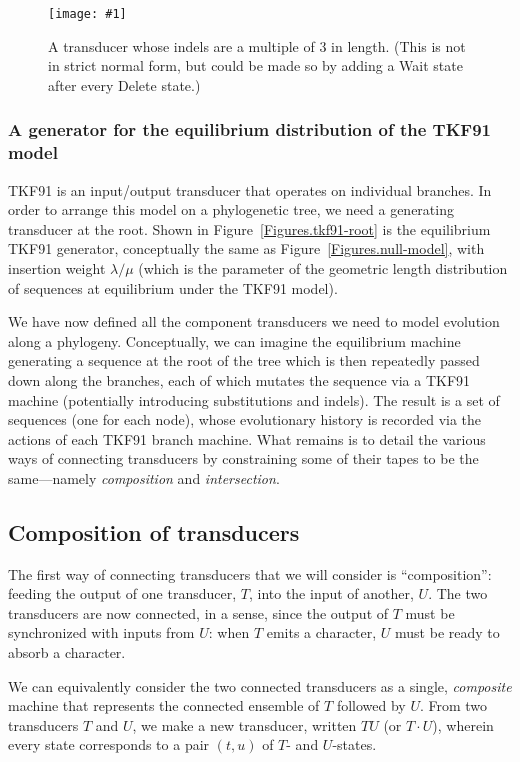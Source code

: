 \documentclass{article}
\newcommand{\seclabel}[1]{\label{sec.#1}}
\newcommand{\figref}[1]{Figure~\ref{Figures.#1}}
\newcommand{\figlabel}[1]{\label{Figures.#1}}
\newcommand{\easyfig}[4]{
\begin{figure}
\texttt{[image: \#1]}
\caption{ \figlabel{#3} #4}
\end{figure}}
\newcommand{\widepdffig}[2]{\easyfig{#1-fig.pdf}{width=\textwidth}{#1}{#2}}
\begin{document}
\widepdffig{triplet}{A transducer whose indels are a multiple of 3 in length.
(This is not in strict normal form, but could be made so by adding a Wait state after every Delete state.)}

\subsubsection{A generator for the equilibrium distribution of the TKF91 model}
TKF91 is an input/output transducer that
operates on individual branches.  In order to arrange this model on a phylogenetic tree,
we need a generating transducer at the root.  
Shown in \figref{tkf91-root} is the equilibrium TKF91 generator, conceptually the same as
\figref{null-model}, with insertion weight $\lambda/\mu$
(which is the parameter of the geometric length distribution of sequences at equilibrium under the TKF91 model).

We have now defined all the component transducers we need to model evolution along a phylogeny. 
Conceptually, we can imagine the equilibrium machine generating a sequence at the root of the
tree which is then repeatedly passed down along the branches, each of which mutates the sequence
via a TKF91 machine (potentially introducing substitutions and indels). 
The result is a set of sequences (one  for each node),
  whose evolutionary history is recorded via  
the actions of each TKF91  branch machine.  
What remains is to detail the various ways of connecting transducers by
 constraining some of their tapes to be the same---namely {\em composition} and {\em intersection}.

\subsection{Composition of transducers}
\seclabel{Tutorial.Composition}
The first way of connecting transducers that we will consider is  ``composition'':
feeding the output of one transducer, $T$, into the input of another, $U$.
The two transducers are now connected, in a sense, since the output of $T$ must be
 synchronized with inputs from $U$: when $T$ emits a character, $U$ must be ready to absorb a character.  

We can equivalently  consider the two connected transducers as
a single, {\em composite} machine that represents
 the connected ensemble of $T$ followed by $U$.  
From two transducers $T$ and $U$,
we make a new transducer, written $TU$ (or $T \cdot U$),
wherein every state corresponds to a pair $(t,u)$ of $T$- and $U$-states.  
 
\end{document}
